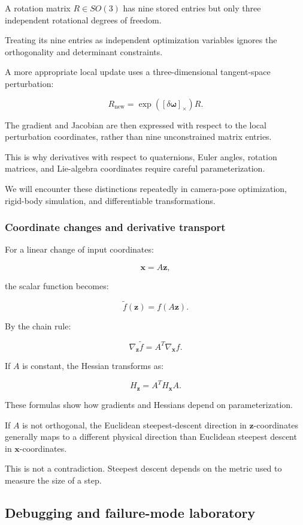 A rotation matrix \(R\in SO(3)\) has nine stored entries but only three independent rotational degrees of freedom.

Treating its nine entries as independent optimization variables ignores the orthogonality and determinant constraints.

A more appropriate local update uses a three-dimensional tangent-space perturbation:

\[
R_{\text{new}}=\exp([\delta\boldsymbol\omega]_\times)R.
\]

The gradient and Jacobian are then expressed with respect to the local perturbation coordinates, rather than nine unconstrained matrix entries.

This is why derivatives with respect to quaternions, Euler angles, rotation matrices, and Lie-algebra coordinates require careful parameterization.

We will encounter these distinctions repeatedly in camera-pose optimization, rigid-body simulation, and differentiable transformations.

\subsubsection{Coordinate changes and derivative transport}\label{02-foundations-ii-ch021-coordinate-changes-and-derivative-transport}

For a linear change of input coordinates:

\[
\mathbf x=A\mathbf z,
\]

the scalar function becomes:

\[
\tilde f(\mathbf z)=f(A\mathbf z).
\]

By the chain rule:

\[
\boxed{ \nabla_{\mathbf z}\tilde f = A^T\nabla_{\mathbf x}f }.
\]

If \(A\) is constant, the Hessian transforms as:

\[
\boxed{ H_{\mathbf z}=A^TH_{\mathbf x}A }.
\]

These formulas show how gradients and Hessians depend on parameterization.

If \(A\) is not orthogonal, the Euclidean steepest-descent direction in \(\mathbf z\)-coordinates generally maps to a different physical direction than Euclidean steepest descent in \(\mathbf x\)-coordinates.

This is not a contradiction. Steepest descent depends on the metric used to measure the size of a step.

\subsection{Debugging and failure-mode laboratory}\label{02-foundations-ii-ch021-debugging-and-failure-mode-laboratory}


